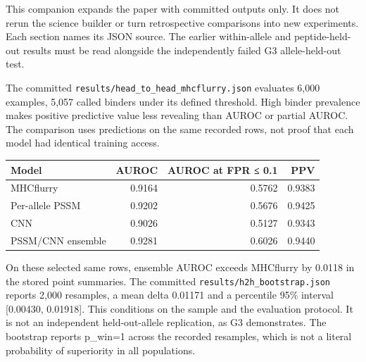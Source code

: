 
This companion expands the paper with committed outputs only. It does not rerun the science builder or turn retrospective comparisons into new experiments. Each section names its JSON source. The earlier within-allele and peptide-held-out results must be read alongside the independently failed G3 allele-held-out test.


The committed \texttt{results/head\_to\_head\_mhcflurry.json} evaluates 6,000 examples, 5,057 called binders under its defined threshold. High binder prevalence makes positive predictive value less revealing than AUROC or partial AUROC. The comparison uses predictions on the same recorded rows, not proof that each model had identical training access.

\begin{longtable}[]{@{}lrrr@{}}
\toprule
Model & AUROC & AUROC at FPR ≤ 0.1 & PPV\tabularnewline
\midrule
\endhead
MHCflurry & 0.9164 & 0.5762 & 0.9383\tabularnewline
Per-allele PSSM & 0.9202 & 0.5676 & 0.9425\tabularnewline
CNN & 0.9026 & 0.5127 & 0.9343\tabularnewline
PSSM/CNN ensemble & 0.9281 & 0.6026 & 0.9440\tabularnewline
\bottomrule
\end{longtable}

On these selected same rows, ensemble AUROC exceeds MHCflurry by 0.0118 in the stored point summaries. The committed \texttt{results/h2h\_bootstrap.json} reports 2,000 resamples, a mean delta 0.01171 and a percentile 95\% interval {[}0.00430, 0.01918{]}. This conditions on the sample and the evaluation protocol. It is not an independent held-out-allele replication, as G3 demonstrates. The bootstrap reports p\_win=1 across the recorded resamples, which is not a literal probability of superiority in all populations.

